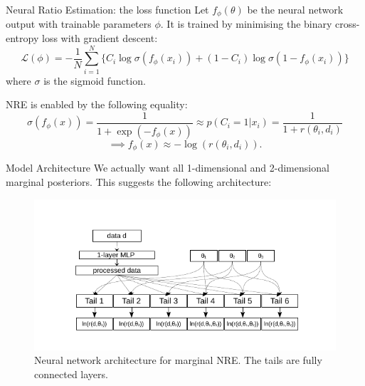 \documentclass{beamer}
\begin{document}
\begin{frame}{Neural Ratio Estimation: the loss function}
    Let $f_\phi(\theta)$ be the neural network output with trainable parameters $\phi$.
    It is trained by minimising the binary cross-entropy loss with gradient descent:
    \begin{equation}
        \mathcal L(\phi) = -\frac{1}{N} \sum_{i=1}^N \Bigg\{ C_i \log \sigma(f_\phi(x_i)) + (1-C_i) \log\sigma(1-f_\phi(x_i)) \Bigg\}
    \end{equation}
    where $\sigma$ is the sigmoid function.
     
    NRE is enabled by the following equality:
        \begin{equation}
            \sigma(f_\phi(x)) = \frac{1}{1 + \exp(-f_\phi(x))}  \approx p(C_i=1 | x_i) = \frac{1}{1+r(\theta_i, d_i)}
        \end{equation}
    \pause
    \begin{equation}
        \implies f_\phi(x) \approx -\log(r(\theta_i, d_i)) .
    \end{equation}
\end{frame}
\begin{frame}{Model Architecture}
We actually want all 1-dimensional and 2-dimensional marginal posteriors. This suggests the following architecture: 
\begin{figure}
    \centering
    \includegraphics{nn_drawing.pdf}
    \caption{Neural network architecture for marginal NRE. The tails are fully connected layers.}
    \label{fig:architecture}
\end{figure}
\end{frame}
\end{document}
